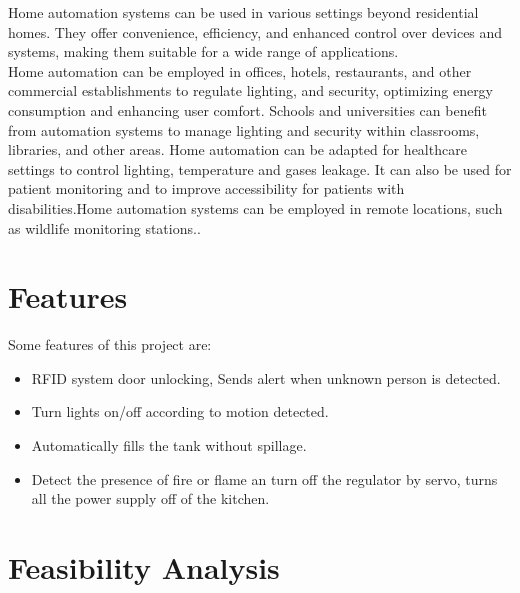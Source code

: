 \documentclass[12pt,a4paper]{report}
\begin{document}
	\begin{justify}
		Home automation systems can be used in various settings beyond residential homes. They offer convenience, efficiency, and enhanced control over devices and systems, making them suitable for a wide range of applications.\\Home automation can be employed in offices, hotels, restaurants, and other commercial establishments to regulate lighting, and security, optimizing energy consumption and enhancing user comfort. Schools and universities can benefit from automation systems to manage lighting and security within classrooms, libraries, and other areas. Home automation can be adapted for healthcare settings to control lighting, temperature and gases leakage. It can also be used for patient monitoring and to improve accessibility for patients with disabilities.Home automation systems can be employed in remote locations, such as wildlife monitoring stations..
	\end{justify}
	
	
	\section{Features}
	
	\raggedright
	{ Some features of this project are: \\
		\begin{itemize}
			\item  RFID system door unlocking, Sends alert when unknown person is detected.
			\item  Turn lights on/off according to motion detected.
			\item  Automatically fills the tank without spillage.
			\item Detect the presence of fire or flame an turn off the regulator by servo, turns all the power supply off of the kitchen. 
			
			
		\end{itemize}
	}
	
	\section{Feasibility Analysis}
	
\end{document}
